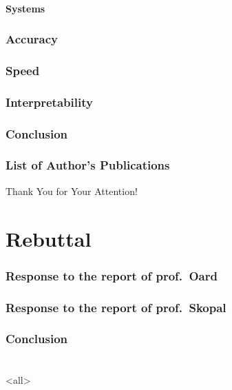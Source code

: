 \subsection{Systems}
\begin{frame}{\secname}
\end{frame}

\section{Accuracy}
\section{Speed}
\section{Interpretability}
\section{Conclusion}
\section{List of Author's Publications}

\begin{frame}[plain]
\vfill
\centerline{Thank You for Your Attention!}
\vfill\vfill
\end{frame}

\part{Rebuttal}
\frame{\vfill\partpage\vfill}

\section{Response to the report of prof.\ Oard}
\section{Response to the report of prof.\ Skopal}
\section{Conclusion}

\part{\bibname}
\frame{\vfill\partpage\vfill}

\section{\bibname}
\begin{frame}[allowframebreaks]{\bibname}
\printbibliography[heading=none]
\end{frame}

\mode
<all>
